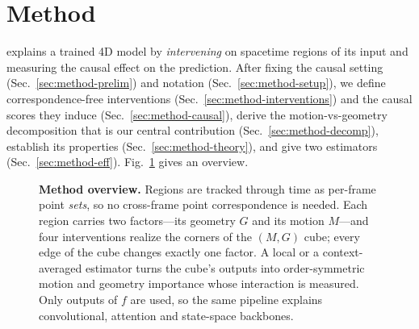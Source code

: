 \section{Method}
\label{sec:method}

\method explains a trained 4D model by \emph{intervening} on spacetime regions of its input and measuring the causal effect on the prediction. After fixing the causal setting (Sec.~\ref{sec:method-prelim}) and notation (Sec.~\ref{sec:method-setup}), we define correspondence-free interventions (Sec.~\ref{sec:method-interventions}) and the causal scores they induce (Sec.~\ref{sec:method-causal}), derive the motion-vs-geometry decomposition that is our central contribution (Sec.~\ref{sec:method-decomp}), establish its properties (Sec.~\ref{sec:method-theory}), and give two estimators (Sec.~\ref{sec:method-eff}). Fig.~\ref{fig:method} gives an overview.

\begin{figure}[t]
\centering
{}
\caption{\textbf{Method overview.} Regions are tracked through time as per-frame point \emph{sets}, so no cross-frame point correspondence is needed. Each region carries two factors---its geometry $G$ and its motion $M$---and four interventions realize the corners of the $(M,G)$ cube; every edge of the cube changes exactly one factor. A local or a context-averaged estimator turns the cube's outputs into order-symmetric motion and geometry importance whose interaction is measured. Only outputs of $f$ are used, so the same pipeline explains convolutional, attention and state-space backbones.}
\label{fig:method}
\end{figure}

